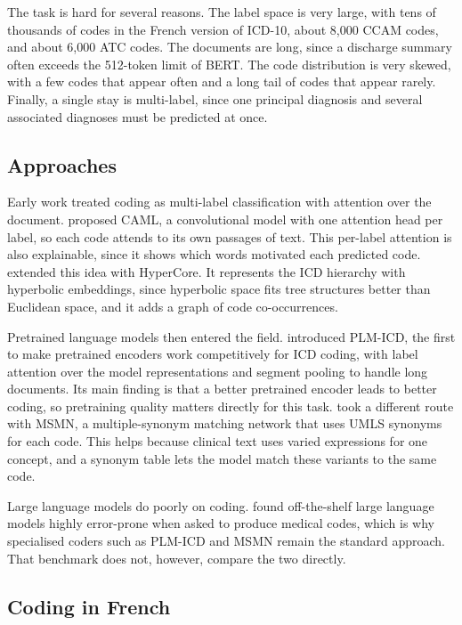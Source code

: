 The task is hard for several reasons. The label space is very large, with tens of thousands of codes
in the French version of ICD-10, about 8{,}000 CCAM codes, and about 6{,}000 ATC codes. The
documents are long, since a discharge summary often exceeds the
512-token limit of BERT. The code distribution is very skewed, with a few codes that appear
often and a long tail of codes that appear rarely. Finally, a single stay is multi-label, since
one principal diagnosis and several associated diagnoses must be predicted at once.

\subsection{Approaches}

Early work treated coding as multi-label classification with attention over the document.
\citet{mullenbach2018caml} proposed CAML, a convolutional model with one attention head per
label, so each code attends to its own passages of text. This per-label attention is also
explainable, since it shows which words motivated each predicted code.
\citet{cao2020hypercore} extended this idea with HyperCore. It represents the ICD hierarchy
with hyperbolic embeddings, since hyperbolic space fits tree structures better than Euclidean
space, and it adds a graph of code co-occurrences.

Pretrained language models then entered the field. \citet{huang2022plmicd} introduced PLM-ICD,
the first to make pretrained encoders work competitively for ICD coding, with label attention over the model
representations and segment pooling to handle long documents. Its main finding is that a better
pretrained encoder leads to better coding, so pretraining quality matters directly for this
task. \citet{yuan2022msmn} took a different route with MSMN, a multiple-synonym matching
network that uses UMLS synonyms for each code. This helps because clinical text uses varied
expressions for one concept, and a synonym table lets the model match these variants to the
same code.

Large language models do poorly on coding. \citet{soroush2024gpt4coding} found off-the-shelf
large language models highly error-prone when asked to produce medical codes, which is why
specialised coders such as PLM-ICD and MSMN remain the standard approach. That benchmark does
not, however, compare the two directly.

\subsection{Coding in French}

